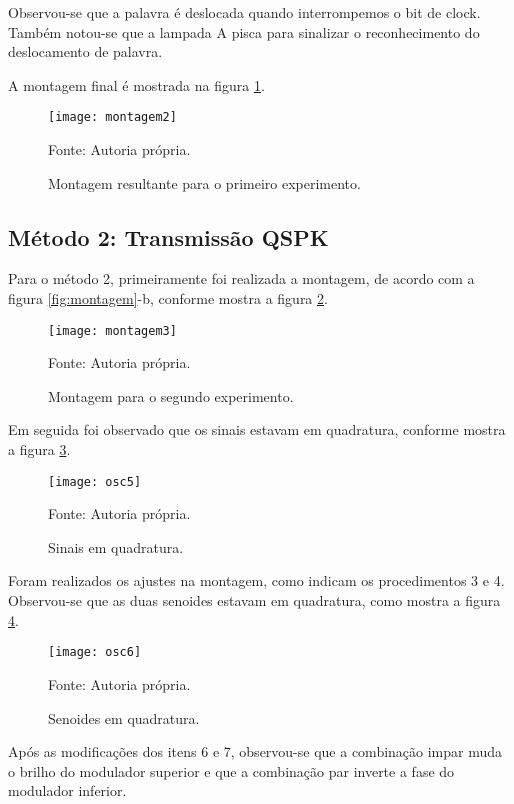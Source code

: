 Observou-se que a palavra é deslocada quando interrompemos o bit de clock. Também notou-se que a lampada A pisca para sinalizar o reconhecimento do deslocamento de palavra.

A montagem final é mostrada na figura \ref{fig:montagem2}.

\begin{figure}[H]
  \centering
  \caption{Montagem resultante para o primeiro experimento.}
  \texttt{[image: montagem2]}
  
  \small Fonte: Autoria própria.
  \label{fig:montagem2}
\end{figure}

\subsection{Método 2: Transmissão QSPK}

Para o método 2, primeiramente foi realizada a montagem, de acordo com a figura \ref{fig:montagem}-b, conforme mostra a figura \ref{fig:montagem3}.

\begin{figure}[H]
  \centering
  \caption{Montagem para o segundo experimento.}
  \texttt{[image: montagem3]}
  
  \small Fonte: Autoria própria.
  \label{fig:montagem3}
\end{figure}

Em seguida foi observado que os sinais estavam em quadratura, conforme mostra a figura \ref{fig:osc5}.

\begin{figure}[H]
  \centering
  \caption{Sinais em quadratura.}
  \texttt{[image: osc5]}
  
  \small Fonte: Autoria própria.
  \label{fig:osc5}
\end{figure}

Foram realizados os ajustes na montagem, como indicam os procedimentos 3 e 4. Observou-se que as duas senoides estavam em quadratura, como mostra a figura \ref{fig:osc6}.

\begin{figure}[H]
  \centering
  \caption{Senoides em quadratura.}
  \texttt{[image: osc6]}
  
  \small Fonte: Autoria própria.
  \label{fig:osc6}
\end{figure}

Após as modificações dos itens 6 e 7, observou-se que a combinação impar muda o brilho do modulador superior e que a combinação par inverte a fase do modulador inferior.

